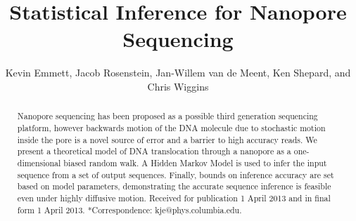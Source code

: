 \documentclass{biophys_letter}
\begin{document}
\setcounter{page}{1} %
\title{Statistical Inference for Nanopore Sequencing}

\author{Kevin Emmett,{\authdagger} Jacob Rosenstein, Jan-Willem van de Meent, Ken Shepard, and Chris Wiggins}

\address{{\addrdagger}Department of Physics and Department of Applied Physics and Applied Math, Columbia University, New York, New York; and School of Engineering, Brown University, Providence, Rhode Island}

\maketitle

\pagestyle{headings}



\begin{abstract}
{Nanopore sequencing has been proposed as a possible third generation sequencing platform, however backwards motion of the DNA molecule due to stochastic motion inside the pore is a novel source of error and a barrier to high accuracy reads. We present a theoretical model of DNA translocation through a nanopore as a one-dimensional biased random walk. A Hidden Markov Model is used to infer the input sequence from a set of output sequences. Finally, bounds on inference accuracy are set based on model parameters, demonstrating the accurate sequence inference is feasible even under highly diffusive motion.}
{Received for publication 1 April 2013 and in final form 1 April 2013.}
{*Correspondence: kje@phys.columbia.edu.}
\end{abstract}

\vspace*{2.7pt}
\end{document}
